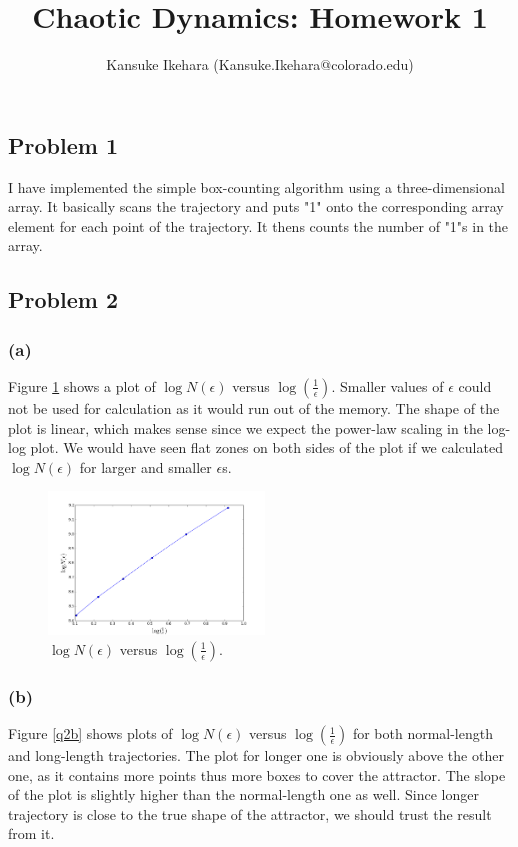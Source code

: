 \documentclass{article}
\title{Chaotic Dynamics: Homework 1}
\author{Kansuke Ikehara (Kansuke.Ikehara@colorado.edu)}
\begin{document}
\maketitle

\subsection*{Problem 1}
I have implemented the simple box-counting algorithm using a three-dimensional array. It basically scans the trajectory and puts "1" onto the corresponding array element for each point of the trajectory. It thens counts the number of "1"s in the array.

\subsection*{Problem 2}
\subsubsection*{(a)}
Figure \ref{q2a} shows a plot of $\log N(\epsilon)$ versus $\log (\frac{1}{\epsilon})$. Smaller values of $\epsilon$ could not be used for calculation as it would run out of the memory. The shape of the plot is linear, which makes sense since we expect the power-law scaling in the log-log plot. We would have seen flat zones on both sides of the plot if we calculated $\log N(\epsilon)$ for larger and smaller $\epsilon$s.

\begin{figure}[h]
  \centering
  \includegraphics[height=1.5in]{figs/q2_a.png}
  \caption{$\log N(\epsilon)$ versus $\log (\frac{1}{\epsilon})$.}
  \label{q2a}
\end{figure}

\subsubsection*{(b)}
Figure \ref{q2b} shows plots of $\log N(\epsilon)$ versus $\log (\frac{1}{\epsilon})$ for both normal-length and long-length trajectories. The plot for longer one is obviously above the other one, as it contains more points thus more boxes to cover the attractor. The slope of the plot is slightly higher than the normal-length one as well. Since longer trajectory is close to the true shape of the attractor, we should trust the result from it.
\end{document}
